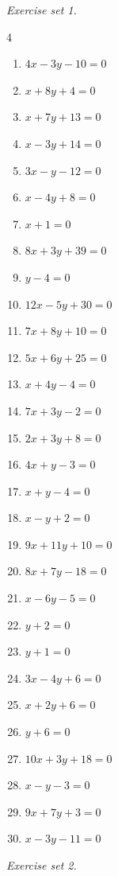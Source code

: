 \par\noindent\emph{Exercise set 1.}\nopagebreak
\begin{multicols}{4}\raggedright
\begin{enumerate}[label=\arabic*., leftmargin=*, itemsep=1pt]
\item $4x-3y-10=0$
\item $x+8y+4=0$
\item $x+7y+13=0$
\item $x-3y+14=0$
\item $3x-y-12=0$
\item $x-4y+8=0$
\item $x+1=0$
\item $8x+3y+39=0$
\item $y-4=0$
\item $12x-5y+30=0$
\item $7x+8y+10=0$
\item $5x+6y+25=0$
\item $x+4y-4=0$
\item $7x+3y-2=0$
\item $2x+3y+8=0$
\item $4x+y-3=0$
\item $x+y-4=0$
\item $x-y+2=0$
\item $9x+11y+10=0$
\item $8x+7y-18=0$
\item $x-6y-5=0$
\item $y+2=0$
\item $y+1=0$
\item $3x-4y+6=0$
\item $x+2y+6=0$
\item $y+6=0$
\item $10x+3y+18=0$
\item $x-y-3=0$
\item $9x+7y+3=0$
\item $x-3y-11=0$
\end{enumerate}
\end{multicols}
\par\noindent\emph{Exercise set 2.}\nopagebreak
